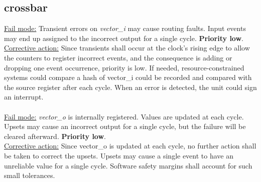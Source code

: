 \subsection{crossbar}

\underline{Fail mode:} Transient errors on \textit{vector\_i} may cause routing faults. Input events may end up assigned to the incorrect output for a single cycle.\textbf{ Priority low}.\\
\underline{Corrective action:} 
Since transients shall occur at the clock's rising edge to allow the counters to register incorrect events, and the consequence is adding or dropping one event occurrence, priority is low. If needed, resource-constrained systems could compare a hash of vector\_i could be recorded and compared with the source register after each cycle. When an error is detected, the unit could sign an interrupt.\\
\\
\underline{Fail mode:} \textit{vector\_o} is internally registered. Values are updated at each cycle. Upsets may cause an incorrect output for a single cycle, but the failure will be cleared afterward. \textbf{Priority low}.\\
\underline{Corrective action:} Since vector\_o is updated at each cycle, no further action shall be taken to correct the upsets. Upsets may cause a single event to have an unreliable value for a single cycle. Software safety margins shall account for such small tolerances.\\
\\
